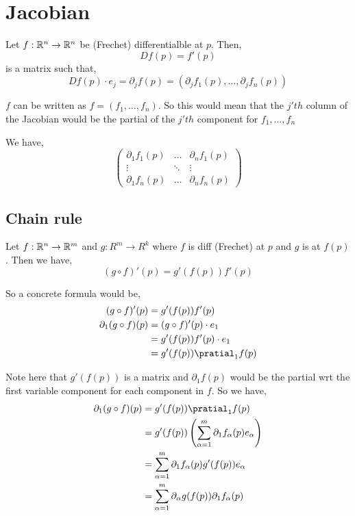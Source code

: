 \section{Jacobian}
\begin{definition}
    Let $f: \mathbb{R}^{n} \to \mathbb{R}^{n}$ be (Frechet) differentialble at $p$.  Then, 
    \[
        D f(p) = f'(p) 
    \]
    is a matrix such that, 
    \[
        Df(p) \cdot e_j = \partial_j f(p) = (\partial_j f_{1}(p), \dots, \partial_j f_n(p))
    \]
\end{definition}
\begin{remark}
    $f$ can be written as $f = (f_{1}, \dots, f_n)$. So this would mean that the $j'th$ column of the Jacobian would be the partial of the $j'th$ component for $f_{1}, \dots, f_n$
\end{remark}
\begin{note}
    We have, 
    \[
        \begin{pmatrix}
            \partial_{1} f_{1}(p) & \dots & \partial_n f_1 (p)\\
            \vdots & \ddots & \vdots\\
            \partial_{1} f_{n}(p) & \dots & \partial_n f_n (p)
        \end{pmatrix}
    \]
\end{note}

\subsection*{Chain rule}
Let $f: \mathbb{R}^{n} \to \mathbb{R}^{m}$ and $g: R^{m} \to R^{k}$ where $f$ is diff (Frechet) at $p$ and $g$ is at $f(p)$. Then we have, 
\[
    (g \circ f)'(p) = g'(f(p)) f'(p)
\]

So a concrete formula would be, 
\begin{align*}
    (g \circ f)'(p) &= g'(f(p)) f'(p)\\
    \partial_1 (g \circ f)(p)&= (g \circ f)'(p) \cdot e_1\\
                             &= g'(f(p)) f'(p) \cdot e_{1}\\
                             &= g'(f(p)) \pratial_{1} f(p)
\end{align*}

Note here that $g'(f(p))$ is a matrix and $\partial_{1} f(p)$ would be the partial wrt the first variable component for each component in $f$. So we have, 
\begin{align*}
    \partial_1 (g \circ f)(p)&=  g'(f(p)) \pratial_{1} f(p)\\
                             &=  g'(f(p)) \left ( \sum_{\alpha=1}^{m} \partial_{1} f_{\alpha}(p) e_{\alpha}\right )\\
                             &= \sum_{\alpha=1}^{m} \partial_{1} f_{\alpha}(p) g'(f(p)) e_{\alpha}\\
                             &= \sum_{\alpha =1}^{m} \partial_{\alpha}g(f(p)) \partial_{1} f_{\alpha}(p)
\end{align*}


